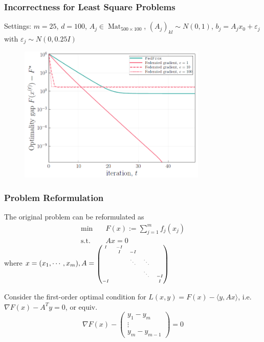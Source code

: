 \begin{frame}
\frametitle{Incorrectness for Least Square Problems}

Settings: $m=25$, $d=100$, $A_j \in \operatorname{Mat}_{500\times 100}$, $(A_j)_{kl} \sim N(0,1)$, $b_j = A_jx_0 + \varepsilon_j$ with $\varepsilon_j \sim N(0,0.25I)$

\begin{figure}
\centering
\includegraphics[width=0.8\textwidth]{images/fedsplit-gap.png}
\end{figure}

\end{frame}


\begin{frame}
\frametitle{Problem Reformulation}

The original problem can be reformulated as
\begin{align*}
    \text{min} & \quad F(x) := \sum_{j=1}^m f_j(x_j) \\
    \text{s.t.} & \quad Ax = 0
\end{align*}
where $x = (x_1, \cdots, x_m), A = \text{{\smaller[3]$\begin{pmatrix} I & -I & & & \\ & I & -I & & \\ & & \ddots & \ddots & \\ & & & \ddots & -I \\ -I & & & & I \end{pmatrix}$}}$

Consider the first-order optimal condition for $L(x,y) = F(x) - \langle y, Ax \rangle$, i.e. $\nabla F(x) - A^Ty = 0$, or equiv.
$$\nabla F(x) - \begin{pmatrix} y_1-y_m \\ \vdots \\ y_m-y_{m-1} \end{pmatrix} = 0$$

\end{frame}

